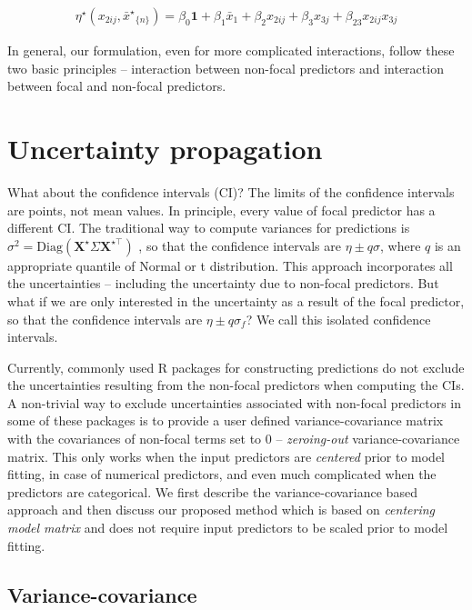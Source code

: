 \documentclass[10pt,letterpaper]{article}
\let\proglang=\textsf
\newcommand{\bX}{{\mathbf X}}
\newcommand{\nset}[1]{#1_{\{n\}}}
\begin{document}
\begin{align*}
\eta^\star(x_{2ij}, \nset{{\bar{x}^\star}}) = \beta_0\mathbf{1} + \beta_1 \bar{x}_1 + \beta_2x_{2ij} + \beta_3x_{3j} + \beta_{23}x_{2ij}x_{3j}
\end{align*}

In general, our formulation, even for more complicated interactions, follow these two basic principles -- interaction between non-focal predictors and interaction between focal and non-focal predictors.


\section*{Uncertainty propagation}

What about the confidence intervals (CI)? The limits of the confidence intervals are points, not mean values. In principle, every value of focal predictor has a different CI. The traditional way to compute variances for predictions is $\sigma^2 = \textrm{Diag}(\bX^\star \Sigma \bX^{\star\top})$ \cite{lenth2018package, fox2009effect}, so that the confidence intervals are $\eta \pm q\sigma$, where $q$ is an appropriate quantile of Normal or t distribution. This approach incorporates all the uncertainties -- including the uncertainty due to non-focal predictors.  But what if we are only interested in the uncertainty as a result of the focal predictor, so that the confidence intervals are $\eta \pm q \sigma_f$? We call this isolated confidence intervals.

Currently, commonly used \proglang{R} packages for constructing predictions do not exclude the uncertainties resulting from the non-focal predictors when computing the CIs. A non-trivial way to exclude uncertainties associated with non-focal predictors in some of these packages is to provide a user defined variance-covariance matrix with the covariances of non-focal terms set to $0$ -- \emph{zeroing-out} variance-covariance matrix. This only works when the input predictors are \emph{centered} prior to model fitting, in case of numerical predictors, and even much complicated when the predictors are categorical. We first describe the variance-covariance based approach and then discuss our proposed method which is based on \emph{centering model matrix} and does not require input predictors to be scaled prior to model fitting.


\subsection*{Variance-covariance}
\end{document}
